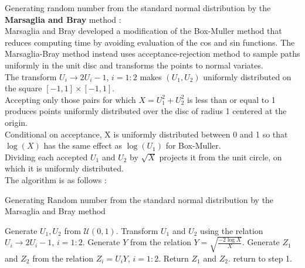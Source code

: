 \documentclass[11pt]{article}
\begin{document}
\noindent{}Generating random number from the standard normal distribution by the \textbf{Marsaglia and Bray} method :\\
Marsaglia and Bray developed a modification of the Box-Muller method that reduces computing time by avoiding evaluation of the cos and sin functions.
The Marsaglia-Bray method instead uses acceptance-rejection method to sample paths uniformly in the unit disc and transforms the points to normal variates.\\
The transform $U_i \rightarrow 2U_i - 1$, $i = 1 : 2$ makes $(U_1, U_2)$ uniformly distributed on the square $[−1, 1] × [−1, 1]$.\\
Accepting only those pairs for which $X = U_{1}^{2} + U_{2}^{2}$ is less than or equal to 1 produces points uniformly distributed over the disc of radius 1 centered at the origin.\\
Conditional on acceptance, X is uniformly distributed between 0 and 1 so that $\log(X)$ has the same effect as $\log(U_1)$ for Box-Muller.\\
Dividing each accepted $U_1$ and $U_2$ by $\sqrt{X}$ projects it from the unit circle, on which it is uniformly distributed.\\
The algorithm is as follows :
\begin{algorithm}[H]
\caption{Generating Random number from the standard normal distribution by the Marsaglia and Bray method}
\begin{algorithmic}[1]
\STATE Generate $U_1, U_2$ from $\mathcal{U}(0,1)$.
\STATE Transform $U_1$ and $U_2$ using the relation $U_i \rightarrow 2U_i-1$,\hspace{4mm} $i = 1 : 2$.
	\STATE Generate $Y$ from the relation $Y = \sqrt{\frac{-2\log{X}}{X}}$.
	\STATE Generate $Z_1$ and $Z_2$ from the relation $Z_{i} = U_{i}Y$,\hspace{4mm} $i = 1 : 2$.
	\STATE Return $Z_1$ and $Z_2$.
\ELSE
	\STATE return to step 1.
\ENDIF
\end{algorithmic}
\end{algorithm}
\newpage
{}
\end{document}
